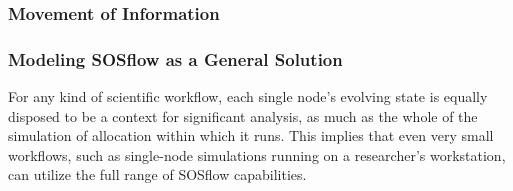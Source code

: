 \subsubsection{Movement of Information}
%
%
%
%
%
%
%
%


\subsubsection{Modeling SOSflow as a General Solution}
%
%
For any kind of scientific workflow, each single node's evolving state
is equally disposed to be a context for significant analysis, as much as
the whole of the simulation of allocation within which it runs.
%
This implies that even very small workflows, such as single-node simulations
running on a researcher's workstation, can utilize the full range of
SOSflow capabilities.


